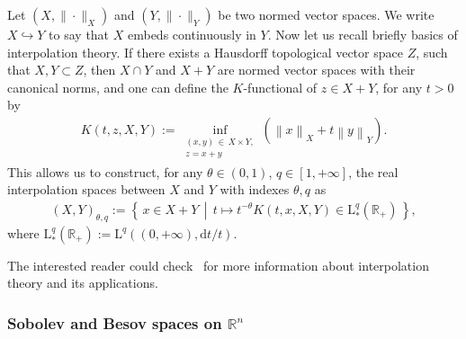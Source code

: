 \documentclass[AHL,Unicode,longabstracts,published]{cedram}
\newcommand{\bbR}{\mathbb{R}}
\newcommand{\rmd}{\mathrm{d}}
\newcommand{\rmL}{\mathrm{L}}
\begin{document}
Let $(X,\|\cdot\|_X)$ and $(Y,\|\cdot\|_Y)$ be two normed vector spaces. We write $X\hookrightarrow Y$ to say that $X$ embeds continuously in $Y$. Now let us recall briefly basics of interpolation theory. If there exists a Hausdorff topological vector space $Z$, such that $X,Y\subset Z$, then $X\cap Y$ and $X+Y$ are normed vector spaces with their canonical norms, and one can define the $K$-functional of $z\in X+Y$, for any $t>0$ by
\begin{align*}
K(t,z,X,Y):= \underset{\substack{(x,y)\,\in\,X\times Y,\\ z=x+y}}{\inf}\left({\left\|{x}\right\|_{X}+t\left\|{y}\right\|_{Y}}\right).
\end{align*}
This allows us to construct, for any $\theta\in(0,1)$, $q\in[1,+\infty]$, the real interpolation spaces between $X$ and $Y$ with indexes $\theta,q$ as
\begin{align*}
(X,Y)_{\theta,q}:= \left\{\, x\in X+Y\,\middle|\,t\longmapsto t^{-\theta}K(t,x,X,Y)\in\rmL^q_\ast(\bbR_+)\,\right\},
\end{align*}
where $\rmL^q_\ast(\bbR_+):=\rmL^q((0,+\infty),\rmd t/t)$.

The interested reader could check~\cite{BerghLofstrom1976,
bookLunardiInterpTheory,
bookTriebel1978} for more information about interpolation theory and its applications.


\subsubsection{Sobolev and Besov spaces on \texorpdfstring{$\bbR^n$}{Rn}}
\end{document}

